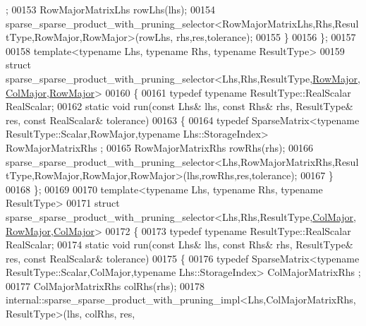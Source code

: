 \begin{DoxyCode}
      ;
00153     RowMajorMatrixLhs rowLhs(lhs);
00154     sparse\_sparse\_product\_with\_pruning\_selector<RowMajorMatrixLhs,Rhs,ResultType,RowMajor,RowMajor>(rowLhs,
      rhs,res,tolerance);
00155   \}
00156 \};
00157 
00158 \textcolor{keyword}{template}<\textcolor{keyword}{typename} Lhs, \textcolor{keyword}{typename} Rhs, \textcolor{keyword}{typename} ResultType>
00159 \textcolor{keyword}{struct }sparse\_sparse\_product\_with\_pruning\_selector<Lhs,Rhs,ResultType,\hyperlink{group__enums_ggaacded1a18ae58b0f554751f6cdf9eb13acfcde9cd8677c5f7caf6bd603666aae3}{RowMajor},
      \hyperlink{group__enums_ggaacded1a18ae58b0f554751f6cdf9eb13a0cbd4bdd0abcfc0224c5fcb5e4f6669a}{ColMajor},\hyperlink{group__enums_ggaacded1a18ae58b0f554751f6cdf9eb13acfcde9cd8677c5f7caf6bd603666aae3}{RowMajor}>
00160 \{
00161   \textcolor{keyword}{typedef} \textcolor{keyword}{typename} ResultType::RealScalar RealScalar;
00162   \textcolor{keyword}{static} \textcolor{keywordtype}{void} run(\textcolor{keyword}{const} Lhs& lhs, \textcolor{keyword}{const} Rhs& rhs, ResultType& res, \textcolor{keyword}{const} RealScalar& tolerance)
00163   \{
00164     \textcolor{keyword}{typedef} SparseMatrix<typename ResultType::Scalar,RowMajor,typename Lhs::StorageIndex> RowMajorMatrixRhs
      ;
00165     RowMajorMatrixRhs rowRhs(rhs);
00166     
      sparse\_sparse\_product\_with\_pruning\_selector<Lhs,RowMajorMatrixRhs,ResultType,RowMajor,RowMajor,RowMajor>(lhs,rowRhs,res,tolerance);
00167   \}
00168 \};
00169 
00170 \textcolor{keyword}{template}<\textcolor{keyword}{typename} Lhs, \textcolor{keyword}{typename} Rhs, \textcolor{keyword}{typename} ResultType>
00171 \textcolor{keyword}{struct }sparse\_sparse\_product\_with\_pruning\_selector<Lhs,Rhs,ResultType,\hyperlink{group__enums_ggaacded1a18ae58b0f554751f6cdf9eb13a0cbd4bdd0abcfc0224c5fcb5e4f6669a}{ColMajor},
      \hyperlink{group__enums_ggaacded1a18ae58b0f554751f6cdf9eb13acfcde9cd8677c5f7caf6bd603666aae3}{RowMajor},\hyperlink{group__enums_ggaacded1a18ae58b0f554751f6cdf9eb13a0cbd4bdd0abcfc0224c5fcb5e4f6669a}{ColMajor}>
00172 \{
00173   \textcolor{keyword}{typedef} \textcolor{keyword}{typename} ResultType::RealScalar RealScalar;
00174   \textcolor{keyword}{static} \textcolor{keywordtype}{void} run(\textcolor{keyword}{const} Lhs& lhs, \textcolor{keyword}{const} Rhs& rhs, ResultType& res, \textcolor{keyword}{const} RealScalar& tolerance)
00175   \{
00176     \textcolor{keyword}{typedef} SparseMatrix<typename ResultType::Scalar,ColMajor,typename Lhs::StorageIndex> ColMajorMatrixRhs
      ;
00177     ColMajorMatrixRhs colRhs(rhs);
00178     internal::sparse\_sparse\_product\_with\_pruning\_impl<Lhs,ColMajorMatrixRhs,ResultType>(lhs, colRhs, res, 

\end{DoxyCode}

